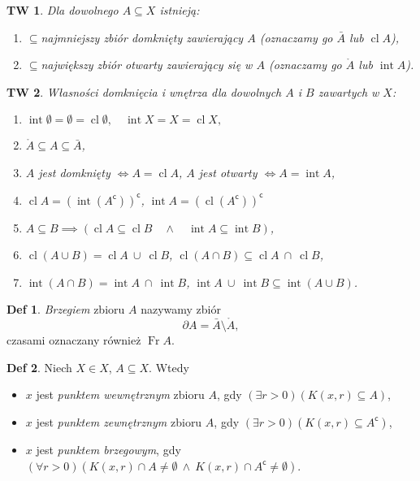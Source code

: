\documentclass[a4paper, 12pt]{mwart}
\newcommand{\cc}{\mathsf{c}}
\DeclareMathOperator{\cl}{cl}
\DeclareMathOperator{\intr}{int}
\theoremstyle{definition}
\newtheorem{definicja}{Def}[section]
\theoremstyle{plain}
\newtheorem{twierdzenie}{TW}[section]
\theoremstyle{remark}
\begin{document}
\begin{twierdzenie}
	Dla dowolnego $A \subseteq X$ istnieją:
	\begin{enumerate}
		\item $\subseteq$\dywiz najmniejszy zbiór domknięty zawierający $A$ (oznaczamy go $\bar A$ lub $\cl A$),
		\item $\subseteq$\dywiz największy zbiór otwarty zawierający się w $A$ (oznaczamy go $\mathring A$ lub $\intr A$).
	\end{enumerate}
\end{twierdzenie}
\begin{twierdzenie}
	Własności domknięcia i wnętrza dla dowolnych $A$ i $B$ zawartych w $X$:
	\begin{enumerate}
		\item $\intr \emptyset = \emptyset = \cl \emptyset, \quad \intr X = X = \cl X,$
		\item $\mathring A \subseteq A \subseteq \bar A$,
		\item $A$ jest domknięty $\iff A = \cl A$, \qquad $A$ jest otwarty $\iff A = \intr A$,
		\item $\cl A = {\left(\intr \left(A^\cc\right) \right)}^\cc$, \qquad $\intr A = {\left(\cl \left(A^\cc\right) \right)}^\cc$
		\item $A \subseteq B \implies (\cl A \subseteq \cl B \quad \land \quad \intr A \subseteq \intr B)$,
		\item $\cl (A \cup B) = \cl A\ \cup\ \cl B$, \quad $\cl (A \cap B) \subseteq \cl A \ \cap\ \cl B$,
		\item $\intr (A \cap B) = \intr A \ \cap\ \intr B$, \quad $\intr A\ \cup\ \intr B \subseteq \intr (A \cup B)$.
	\end{enumerate}
\end{twierdzenie}
\begin{definicja}
	\emph{Brzegiem} zbioru $A$ nazywamy zbiór
	\begin{equation}
		\partial A = \bar A \setminus \mathring A,
	\end{equation}
	czasami oznaczany również $\operatorname{Fr} A$. %
\end{definicja}
\begin{definicja}
	Niech $X \in X$, $A \subseteq X$. Wtedy
	\renewcommand{\labelitemi}{\textbullet }
	\begin{itemize}
		\item $x$ jest \emph{punktem wewnętrznym} zbioru $A$, gdy $\left(\exists r > 0\right)\left(K(x, r) \subseteq A\right)$,
		\item $x$ jest \emph{punktem zewnętrznym} zbioru $A$, gdy $\left(\exists r > 0\right)\left(K(x, r) \subseteq A^\cc\right)$,
		\item $x$ jest \emph{punktem brzegowym}, gdy $\left(\forall r > 0\right)\left(K(x, r) \cap A \neq \emptyset\ \land\ K(x, r) \cap A^\cc \neq \emptyset\right)$.
	\end{itemize}
\end{definicja}
\end{document}

